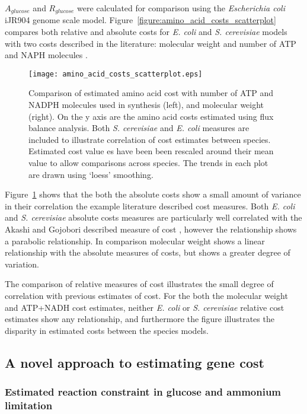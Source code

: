 $A_{glucose}$ and $R_{glucose}$ were calculated for comparison using the \emph{Escherichia coli} iJR904 genome scale model. Figure~\vref{figure:amino_acid_costs_scatterplot} compares both relative and absolute costs for \emph{E. coli} and \emph{S. cerevisiae} models with two costs described in the literature: molecular weight \cite{seligmann2003} and number of ATP and NAPH molecules \cite{akashi2002}.

\begin{figure}
\centering
\texttt{[image: amino\_acid\_costs\_scatterplot.eps]}
\caption[Comparison of the genome scale model derived cost data sets.]{Comparison of estimated amino acid cost with number of ATP and NADPH molecules used in synthesis (left), and molecular weight (right). On the y axis are the amino acid costs estimated using flux balance analysis. Both \emph{S. cerevisiae} and \emph{E. coli} measures are included to illustrate correlation of cost estimates between species. Estimated cost value
es have been been rescaled around their mean value to allow comparisons across species. The trends in each plot are drawn using `loess' smoothing.}
\label{figure:amino_acid_costs_scatterplot}
\end{figure}

Figure~\ref{figure:amino_acid_costs_scatterplot} shows that the both the absolute costs show a small amount of variance in their correlation the example literature described cost measures. Both \emph{E. coli} and \emph{S. cerevisiae} absolute costs measures are particularly well correlated with the Akashi and Gojobori described measure of cost \cite{akashi2002}, however the relationship shows a parabolic relationship. In comparison molecular weight shows a linear relationship with the absolute measures of costs, but shows a greater degree of variation.

The comparison of relative measures of cost illustrates the small degree of correlation with previous estimates of cost. For the both the molecular weight and ATP+NADH cost estimates, neither \emph{E. coli} or \emph{S. cerevisiae} relative cost estimates show any relationship, and furthermore the figure illustrates the disparity in estimated costs between the species models.

\subsection{A novel approach to estimating gene cost}

\subsubsection{Estimated reaction constraint in glucose and ammonium limitation}

